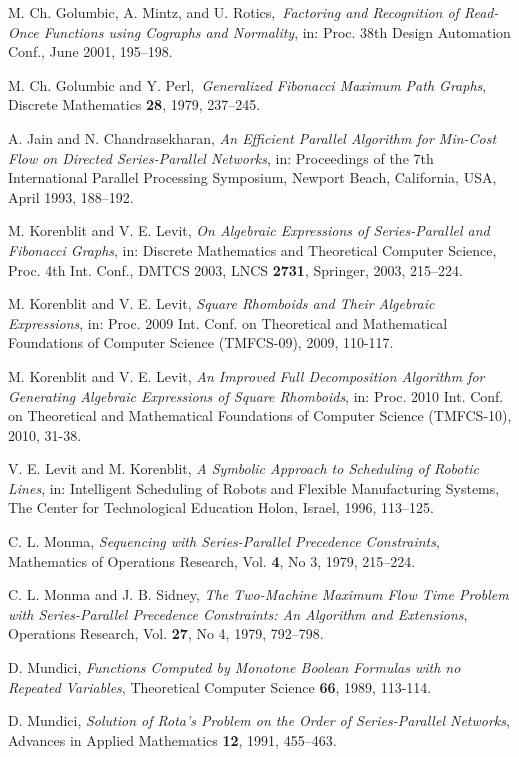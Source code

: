 \documentclass[11pt]{article}\usepackage{amsmath}
\begin{document}
\begin{thebibliography}{99}
M. Ch. Golumbic, A. Mintz, and U. Rotics,\textit{\ }\emph{Factoring and Recognition of Read-Once Functions using Cographs and
Normality}, in: Proc. 38th Design Automation Conf., June 2001, 195--198.

M. Ch. Golumbic and Y. Perl,\textit{\ }\emph{Generalized
Fibonacci Maximum Path Graphs}, Discrete Mathematics \textbf{28}, 1979,
237--245.\emph{\ }

A. Jain and N. Chandrasekharan, \emph{An Efficient Parallel
Algorithm for Min-Cost Flow on Directed Series-Parallel Networks}, in:
Proceedings of the 7th International Parallel Processing Symposium, Newport
Beach, California, USA, April 1993, 188--192.

M. Korenblit and V. E. Levit, \emph{On Algebraic Expressions of
Series-Parallel and Fibonacci Graphs}, in: Discrete Mathematics and
Theoretical Computer Science, Proc. 4th Int. Conf., DMTCS 2003, LNCS
\textbf{2731}, Springer, 2003, 215--224.

M. Korenblit and V. E. Levit, \emph{Square Rhomboids and Their
Algebraic Expressions}, in: Proc. 2009 Int. Conf. on Theoretical and
Mathematical Foundations of Computer Science (TMFCS-09), 2009, 110-117.

M. Korenblit and V. E. Levit, \emph{An Improved Full
Decomposition Algorithm for Generating Algebraic Expressions of Square
Rhomboids}, in: Proc. 2010 Int. Conf. on Theoretical and Mathematical
Foundations of Computer Science (TMFCS-10), 2010, 31-38.

V. E. Levit and M. Korenblit, \emph{A Symbolic Approach to
Scheduling of Robotic Lines}, in: Intelligent Scheduling of Robots and
Flexible Manufacturing Systems, The Center for Technological Education Holon,
Israel, 1996, 113--125.

C. L. Monma, \emph{Sequencing with Series-Parallel Precedence
Constraints}, Mathematics of Operations Research, Vol. \textbf{4}, No 3, 1979, 215--224.

C. L. Monma and J. B. Sidney, \emph{The Two-Machine Maximum Flow
Time Problem with Series-Parallel Precedence Constraints: An Algorithm and
Extensions}, Operations Research, Vol. \textbf{27}, No 4, 1979, 792--798.

D. Mundici, \emph{Functions Computed by Monotone Boolean
Formulas with no Repeated Variables}, Theoretical Computer Science
\textbf{66}, 1989, 113-114.

D. Mundici, \emph{Solution of Rota's Problem on the Order of
Series-Parallel Networks}, Advances in Applied Mathematics \textbf{12}, 1991, 455--463.


\end{thebibliography}
\end{document}
